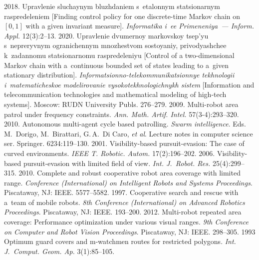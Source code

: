   \begin{multicols}{2}

\renewcommand{\bibname}{\protect\rmfamily References}

{\small\frenchspacing
 {%
 \begin{thebibliography}{99}
 2018. Upravlenie sluchaynym bluzhdaniem 
s~etalonnym statsionarnym raspredeleniem [Finding control policy for one discrete-time 
Markov chain on $[0,1]$ with a given invariant measure]. \textit{Informatika i~ee 
Primeneniya~--- Inform. \mbox{Appl.}} 12(3):2--13. 
 2020. Upravlenie 
dvumernoy markovskoy tsep'yu s~ne\-pre\-ryv\-nym ogranichennym mnozhestvom so\-sto\-yaniy, 
pri\-vo\-dya\-shchee k~za\-dan\-no\-mu sta\-tsi\-o\-nar\-no\-mu ras\-pre\-de\-le\-niyu [Control of a two-dimensional 
Markov chain with a~continuous bounded set of states leading to a~given stationary distribution]. 
\textit{Informatsionno-telekommunikatsionnye tekhnologii i~matematicheskoe modelirovanie 
vysokotekhnologichnykh sistem} [Information and telecommunication technologies and 
mathematical modeling of high-tech systems]. Moscow: RUDN University Publs. 276--279.
 2009. Multi-robot area patrol under frequency 
constraints. \textit{Ann. Math. Artif. Intel.} 57(3-4):293--320. 
 2010. Autonomous multi-agent cycle based patrolling. 
\textit{Swarm intelligence}. Eds. M.~Do\-ri\-go, M.~Birattari, G.\,A.~Di Caro, \textit{et al}.
 Lecture notes in computer science ser. Springer.  6234:119--130. 
 2001. Visibility-based pursuit-evasion: The case of 
curved environments. \textit{IEEE T. Robotic. Autom.} 17(2):196--202. 
 2006. Visibility-based pursuit-evasion with 
limited field of view. \textit{Int. J.~Robot. Res.} 25(4):299--315. 
 2010. Complete and robust 
cooperative robot area coverage with limited range. \textit{Conference (International) on 
Intelligent Robots and Systems Proceedings}. Piscataway, NJ: IEEE. 5577--5582. 
 1997. Cooperative search and rescue with 
a~team of mobile robots. \textit{8th Conference (International) on Advanced Robotics 
Proceedings}. Piscataway, NJ: IEEE. 193--200.
 2012. Multi-robot repeated area 
coverage: Performance optimization under various visual ranges. \textit{9th Conference on 
Computer and Robot Vision Proceedings}. Piscataway, NJ: IEEE. 298--305. 
 1993 Optimum guard covers and  
m-watchmen routes for restricted polygons. \textit{Int. J.~Comput. Geom.  
Ap.} 3(1):85--105. 


\end{thebibliography}}}
\end{multicols}
